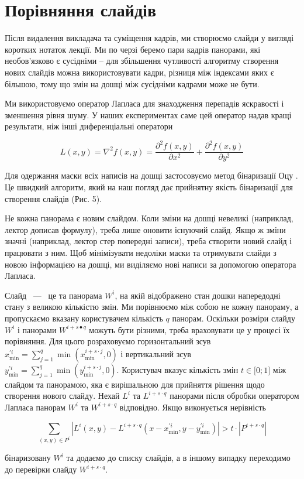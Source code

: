 \section{Порівняння слайдів}

Після видалення викладача та суміщення кадрів, ми створюємо слайди у вигляді
коротких нотаток лекції. Ми по черзі беремо пари кадрів панорами, які
необов'язково є сусідніми – для збільшення чутливості алгоритму створення нових
слайдів можна використовувати кадри, різниця між індексами яких є більшою, тому що
змін на дошці між сусідніми кадрами може не бути.

Ми використовуємо оператор Лапласа  для знаходження перепадів
яскравості і зменшення рівня шуму. У наших експериментах саме цей
оператор надав кращі результати, ніж інші диференціальні оператори

\begin{equation*}
L(x,y) = \nabla^{2}f(x,y) = \frac{\partial^{2}f(x,y)}{\partial x^{2}} + \frac{\partial^{2}f(x,y)}{\partial y^{2}}
\end{equation*}

Для одержання маски всіх написів на дошці застосовуємо метод бінаризації
Оцу . Це швидкий алгоритм, який на наш погляд дає прийнятну
якість бінаризації для створення слайдів (Рис. 5).

Не кожна панорама є новим слайдом. Коли зміни на дошці невеликі
(наприклад, лектор дописав формулу), треба лише оновити існуючий слайд.
Якщо ж зміни значні (наприклад, лектор стер попередні записи), треба
створити новий слайд і працювати з ним. Щоб мінімізувати недоліки маски
та отримувати слайди з новою інформацією на дошці, ми виділяємо нові
написи за допомогою оператора Лапласа.

Слайд ~---~ це та панорама \(W^{i}\), на якій відображено стан дошки
напередодні стану з великою кількістю змін. Ми порівнюємо між собою не
кожну панораму, а пропускаємо вказану користувачем кількість \(q\)
панорам. Оскільки розміри слайду \(W^{i}\) і панорами
\(W^{i + s \bullet q}\) можуть бути різними, треба враховувати це у
процесі їх порівняння. Для цього розраховуємо горизонтальний зсув
\(x_{\min}^{'i} = \sum_{j = 1}^{q}{\min\left( x_{\min}^{i + s \cdot j},0 \right)}\)
і вертикальний зсув
\(y_{\min}^{'i} = \sum_{j = 1}^{q}{\min\left( y_{\min}^{i + s \cdot j},0 \right)}\).
Користувач вказує кількість змін \(t \in \lbrack 0;1\rbrack\) між
слайдом та панорамою, яка є вирішальною для прийняття рішення щодо
створення нового слайду. Нехай \(L^{i}\) та \(L^{i + s \cdot q}\)
панорами після обробки оператором Лапласа панорам \(W^{i}\) та
\(W^{i + s \cdot q}\) відповідно. Якщо виконується нерівність

\begin{equation*}
\sum_{(x,y) \in P^{i}}^{}| L^{i}(x,y) - L^{i + s \cdot q}( x - x_{\min}^{'i},y - y_{\min}^{'i} ) | > t \cdot | P^{i + s \cdot q} |
\end{equation*}

бінаризовану \(W^{i}\) та додаємо до списку слайдів, а в іншому випадку переходимо до
перевірки слайду \(W^{i + s \cdot q}\).